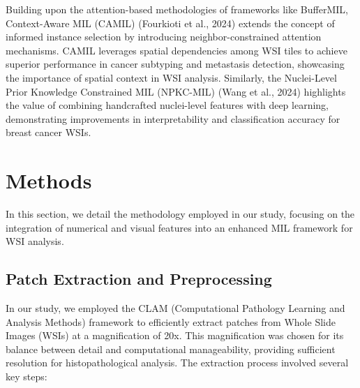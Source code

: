 \documentclass[10pt,twocolumn]{article}
\begin{document}
Building upon the attention-based methodologies of frameworks like BufferMIL, Context-Aware MIL (CAMIL) (Fourkioti et al., 2024)\cite{fourkioti2023camil} extends the concept of informed instance selection by introducing neighbor-constrained attention mechanisms. CAMIL leverages spatial dependencies among WSI tiles to achieve superior performance in cancer subtyping and metastasis detection, showcasing the importance of spatial context in WSI analysis. Similarly, the Nuclei-Level Prior Knowledge Constrained MIL (NPKC-MIL) (Wang et al., 2024)\cite{WANG2024109826} highlights the value of combining handcrafted nuclei-level features with deep learning, demonstrating improvements in interpretability and classification accuracy for breast cancer WSIs.



\section{Methods} \label{methods}

In this section, we detail the methodology employed in our study, focusing on the integration of numerical and visual features into an enhanced MIL framework for WSI analysis.

\subsection{Patch Extraction and Preprocessing}

In our study, we employed the CLAM (Computational Pathology Learning and Analysis Methods) framework to efficiently extract patches from Whole Slide Images (WSIs) at a magnification of 20x. This magnification was chosen for its balance between detail and computational manageability, providing sufficient resolution for histopathological analysis. The extraction process involved several key steps:
\end{document}
